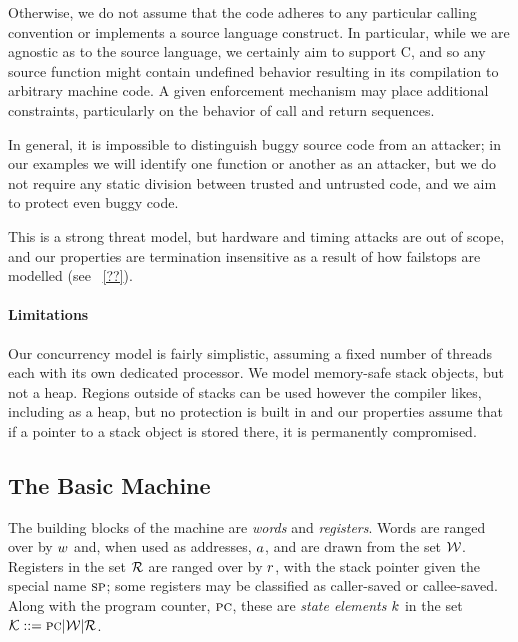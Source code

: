 \documentclass[10pt,conference]{ieeetran}%
\theoremstyle{definition}
\begin{document}
Otherwise, we do not assume that the code adheres to any particular
calling convention or implements a source language construct.
In particular, while we are agnostic as to the source
language, we certainly aim to support C, and so any source function might contain undefined
behavior resulting in its compilation to arbitrary machine code. A given enforcement
mechanism may place additional constraints, particularly on the behavior of
call and return sequences.

In general, it is impossible to distinguish buggy source code from an attacker; in
our examples we will identify one function or another as an attacker, but we do not
require any static division between trusted and untrusted code, and we aim to protect
even buggy code.

This is a strong threat model, but hardware and timing attacks are out of scope,
and our properties are termination insensitive as a result of how failstops are
modelled (see ~\ref{??}).

\paragraph*{Limitations}

Our concurrency model is fairly
simplistic, assuming a fixed number of threads each with its own dedicated processor.
We model memory-safe stack objects, but not a heap. Regions outside of
stacks can be used however the compiler likes, including as a heap, but no protection is
built in and our properties assume that if a pointer to a stack object is stored there,
it is permanently compromised.

\subsection{The Basic Machine}

The building blocks of the machine are {\em words} and {\em registers}.
Words are ranged over by \(w\) and, when used as addresses, \(a\),
and are drawn from the set \({\mathcal W}\).
Registers in the set \({\mathcal R}\) are ranged over by \(r\), with the stack pointer
given the special name \(\textsc{sp}\); 
some registers may be classified as caller-saved or callee-saved.
%
Along with the program counter, \(\textsc{pc}\), these are {\em state elements} \(k\)
in the set \({\mathcal K} ::= \textsc{pc} | {\mathcal W} | {\mathcal R}\).
\end{document}
